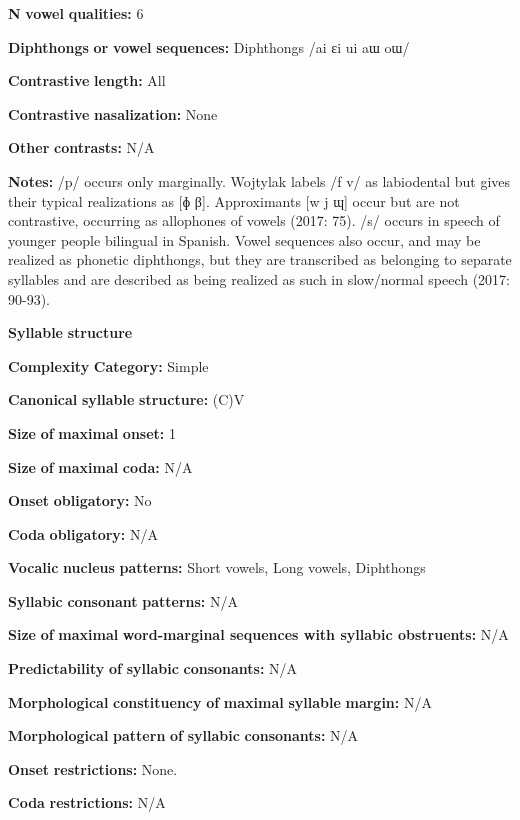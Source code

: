 \begin{styleBody}
\textbf{N} \textbf{vowel} \textbf{qualities:} 6

\textbf{Diphthongs} \textbf{or} \textbf{vowel} \textbf{sequences:} Diphthongs /ai ɛi ui aɯ oɯ/

\textbf{Contrastive} \textbf{length:} All

\textbf{Contrastive} \textbf{nasalization:} None

\textbf{Other} \textbf{contrasts:} N/A

\textbf{Notes:} /p/ occurs only marginally. Wojtylak labels /f v/ as labiodental but gives their typical realizations as [ɸ β]. Approximants [w j ɰ] occur but are not contrastive, occurring as allophones of vowels (2017: 75). /s/ occurs in speech of younger people bilingual in Spanish. Vowel sequences also occur, and may be realized as phonetic diphthongs, but they are transcribed as belonging to separate syllables and are described as being realized as such in slow/normal speech (2017: 90-93).

\textbf{Syllable} \textbf{structure}

\textbf{Complexity} \textbf{Category:} Simple

\textbf{Canonical} \textbf{syllable} \textbf{structure:} (C)V \citep[93-95]{Wojtylak2017}

\textbf{Size} \textbf{of} \textbf{maximal} \textbf{onset:} 1

\textbf{Size} \textbf{of} \textbf{maximal} \textbf{coda:} N/A

\textbf{Onset} \textbf{obligatory:} No

\textbf{Coda} \textbf{obligatory:} N/A

\textbf{Vocalic} \textbf{nucleus} \textbf{patterns:} Short vowels, Long vowels, Diphthongs

\textbf{Syllabic} \textbf{consonant} \textbf{patterns:} N/A

\textbf{Size} \textbf{of} \textbf{maximal} \textbf{word{}-marginal sequences with syllabic obstruents:} N/A

\textbf{Predictability} \textbf{of} \textbf{syllabic} \textbf{consonants:} N/A

\textbf{Morphological} \textbf{constituency} \textbf{of} \textbf{maximal} \textbf{syllable} \textbf{margin:} N/A

\textbf{Morphological} \textbf{pattern} \textbf{of} \textbf{syllabic} \textbf{consonants:} N/A

\textbf{Onset} \textbf{restrictions:} None.

\textbf{Coda} \textbf{restrictions:} N/A


\end{styleBody}
